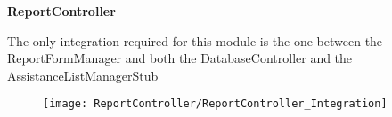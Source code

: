 \begin{Large}
\textbf{ReportController}
\end{Large}

The only integration required for this module is the one between the ReportFormManager and both the DatabaseController and the AssistanceListManagerStub
\begin{figure}[H]
\texttt{[image: ReportController/ReportController\_Integration]}
\end{figure}

